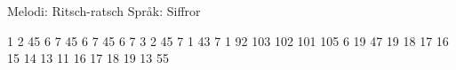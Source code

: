 \begin{song}


\begin{songmeta}
Melodi: Ritsch-ratsch
Språk: Siffror
\end{songmeta}

\begin{songtext}
1 2 45 6 7 45 6 7 45 6 7
3 2 45 7 1 43 7 1 92
103 102 101 105 6 19 47
19 18 17 16 15 14 13 11
16 17 18 19 13 55
\end{songtext}

\end{song}

